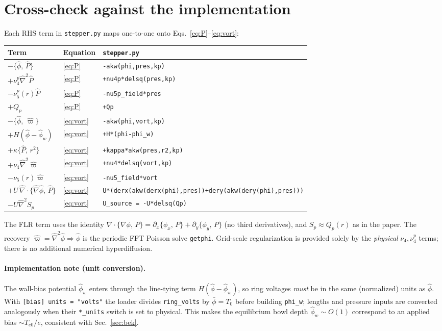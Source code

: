 \documentclass[11pt]{article}
\newcommand{\pb}[2]{\{#1,\,#2\}}
\begin{document}
\section{Cross-check against the implementation}
\label{sec:code}
Each RHS term in \texttt{stepper.py} maps one-to-one onto
Eqs.~\eqref{eq:P}--\eqref{eq:vort}:
\begin{center}
\begin{tabular}{lll}
\toprule
Term & Equation & \texttt{stepper.py}\\
\midrule
$-\pb{\hat\phi}{\hat P}$              & \eqref{eq:P}    & \texttt{-akw(phi,pres,kp)}\\
$+\nu_4^p\hat\nabla^2\hat P$          & \eqref{eq:P}    & \texttt{+nu4p*delsq(pres,kp)}\\
$-\nu_5^p(r)\hat P$                   & \eqref{eq:P}    & \texttt{-nu5p\_field*pres}\\
$+Q_p$                               & \eqref{eq:P}    & \texttt{+Qp}\\
$-\pb{\hat\phi}{\hat\varpi}$          & \eqref{eq:vort} & \texttt{-akw(phi,vort,kp)}\\
$+H(\hat\phi-\hat\phi_w)$             & \eqref{eq:vort} & \texttt{+H*(phi-phi\_w)}\\
$+\kappa\pb{\hat P}{r^2}$             & \eqref{eq:vort} & \texttt{+kappa*akw(pres,r2,kp)}\\
$+\nu_4\hat\nabla^2\hat\varpi$        & \eqref{eq:vort} & \texttt{+nu4*delsq(vort,kp)}\\
$-\nu_5(r)\hat\varpi$                 & \eqref{eq:vort} & \texttt{-nu5\_field*vort}\\
$+U\,\hat\nabla\!\cdot\!\pb{\hat\nabla\hat\phi}{\hat P}$
   & \eqref{eq:vort} & \texttt{U*(derx(akw(derx(phi),pres))+dery(akw(dery(phi),pres)))}\\
$-U\hat\nabla^2 S_p$                  & \eqref{eq:vort} & \texttt{U\_source = -U*delsq(Qp)}\\
\bottomrule
\end{tabular}
\end{center}
The FLR term uses the identity $\nabla\!\cdot\!\pb{\nabla\phi}{P} =
\partial_x\pb{\phi_x}{P} + \partial_y\pb{\phi_y}{P}$ (no third derivatives), and
$S_p\approx Q_p(r)$ as in the paper. The recovery $\hat\varpi=\hat\nabla^2\hat\phi
\Rightarrow\hat\phi$ is the periodic FFT Poisson solve \texttt{getphi}. Grid-scale
regularization is provided solely by the \emph{physical} $\nu_4,\nu_4^p$ terms;
there is no additional numerical hyperdiffusion.

\paragraph{Implementation note (unit conversion).} The wall-bias potential
$\hat\phi_w$ enters through the line-tying term $H(\hat\phi-\hat\phi_w)$, so ring
voltages \emph{must} be in the same (normalized) units as $\hat\phi$. With
\texttt{[bias] units = "volts"} the loader divides \texttt{ring\_volts} by
$\bar\phi=T_0$ before building \texttt{phi\_w}; lengths and pressure inputs are
converted analogously when their \texttt{*\_units} switch is set to physical.
This makes the equilibrium bowl depth $\hat\phi_w\!\sim\!O(1)$ correspond to an
applied bias $\sim T_{e0}/e$, consistent with Sec.~\ref{sec:bek}.
\end{document}
